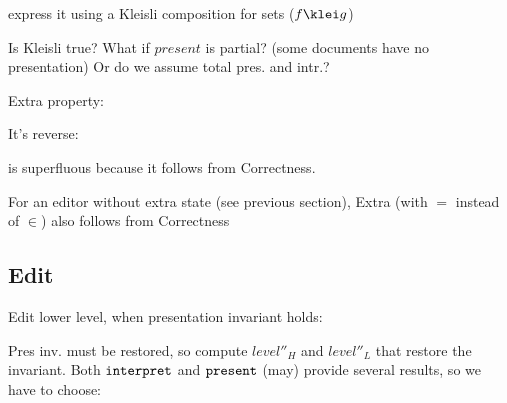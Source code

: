 

express it using a Kleisli composition for sets ($f \klei g$) \cite{?}   
 


Is Kleisli true? What if $present$ is partial? (some documents have no presentation) Or do we assume total pres. and intr.?


Extra property:


It's reverse:
 

is superfluous because it follows from {\sc Correctness}.

For an editor without extra state (see previous section), {\sc Extra} (with $=$ instead of $\in$) also follows from {\sc Correctness}

\subsection{Edit}

\bl
\* Edit lower level, when presentation invariant holds:
\el


Pres inv. must be restored, so compute $level''_{H}$ and $level''_{L}$ that restore the invariant. 
Both ${\tt interpret}$ and ${\tt present}$ (may) provide several results, so we have to choose:


